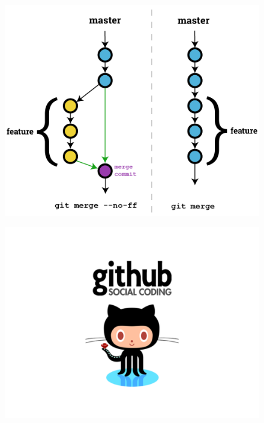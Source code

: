 \documentclass{beamer}
\begin{document}
\begin{frame}
  \begin{center}
    \resizebox{0.6\textwidth}{!}{\FiraTitle \color{purple}{Merging}}
  \end{center}
  \begin{figure}
    \centering
    \includegraphics[height=0.7\textheight]{fusion}
  \end{figure}
\end{frame}

\begin{frame}
  \begin{figure}
    \centering
    \includegraphics[width=\textwidth]{githublogo}
  \end{figure}
\end{frame}
\end{document}
